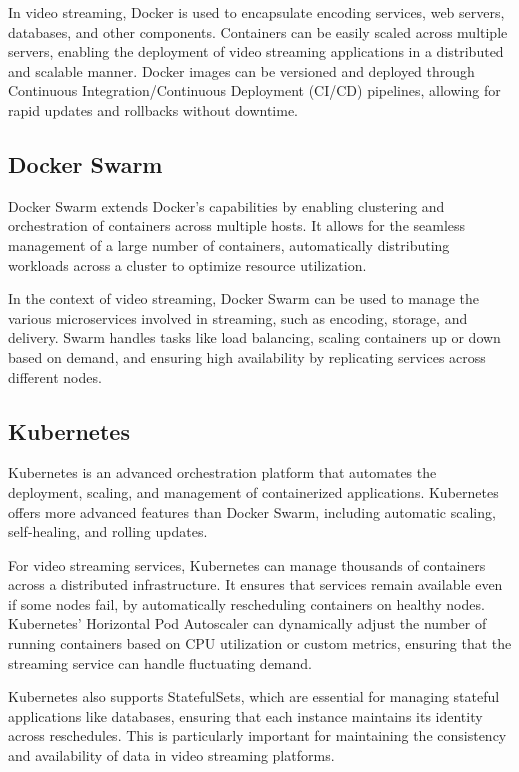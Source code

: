 In video streaming, Docker is used to encapsulate encoding services, web servers, databases, and other components. Containers can be easily scaled across multiple servers, enabling the deployment of video streaming applications in a distributed and scalable manner. Docker images can be versioned and deployed through Continuous Integration/Continuous Deployment (CI/CD) pipelines, allowing for rapid updates and rollbacks without downtime\cite{docker_deployment}.

\subsection{Docker Swarm}
Docker Swarm extends Docker's capabilities by enabling clustering and orchestration of containers across multiple hosts. It allows for the seamless management of a large number of containers, automatically distributing workloads across a cluster to optimize resource utilization.

In the context of video streaming, Docker Swarm can be used to manage the various microservices involved in streaming, such as encoding, storage, and delivery. Swarm handles tasks like load balancing, scaling containers up or down based on demand, and ensuring high availability by replicating services across different nodes\cite{docker_swarm_deployment}.

\subsection{Kubernetes}
Kubernetes is an advanced orchestration platform that automates the deployment, scaling, and management of containerized applications. Kubernetes offers more advanced features than Docker Swarm, including automatic scaling, self-healing, and rolling updates.

For video streaming services, Kubernetes can manage thousands of containers across a distributed infrastructure. It ensures that services remain available even if some nodes fail, by automatically rescheduling containers on healthy nodes. Kubernetes' Horizontal Pod Autoscaler can dynamically adjust the number of running containers based on CPU utilization or custom metrics, ensuring that the streaming service can handle fluctuating demand\cite{kubernetes_video_deployment}.

Kubernetes also supports StatefulSets, which are essential for managing stateful applications like databases, ensuring that each instance maintains its identity across reschedules. This is particularly important for maintaining the consistency and availability of data in video streaming platforms\cite{statefulset_kubernetes}.

